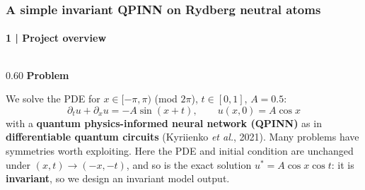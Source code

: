 \documentclass[aspectratio=169,9pt]{beamer}
\newcommand{\head}[2][pq]{{\color{#1}\textbf{#2}}\par\vspace{0.4ex}}
\newcommand{\term}[1]{\textbf{#1}}   %
\begin{document}
\begin{frame}[t]
\frametitle{A simple invariant QPINN on Rydberg neutral atoms}
\framesubtitle{1 \;|\; Project overview}
\vspace{-1.4ex}
\begin{columns}[T,onlytextwidth]
\begin{column}{0.60\textwidth}
\footnotesize
\setlength{\abovedisplayskip}{1pt}\setlength{\belowdisplayskip}{1pt}
\head{Problem}
We solve the PDE for $x\in[-\pi,\pi)$ (mod $2\pi$), $t\in[0,1]$, $A=0.5$:
\[
  \partial_t u+\partial_x u=-A\sin(x+t),\qquad u(x,0)=A\cos x
\]
with a \term{quantum physics-informed neural network (QPINN)} as in \term{differentiable
quantum circuits} (Kyriienko \emph{et al.}, 2021). Many problems have symmetries
worth exploiting. Here the PDE and initial condition are unchanged under $(x,t)\to(-x,-t)$,
and so is the exact solution $u^\ast=A\cos x\cos t$: it is \term{invariant}, so we design an invariant model output.


\end{column}
\end{columns}
\end{frame}
\end{document}
